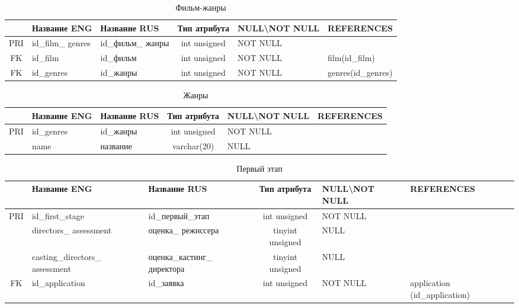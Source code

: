 \documentclass[11pt,a4paper,final]{article} %
\begin{document}
	
\begin{table}[H]
	\centering
	\begin{tabular}{|c|p{2.8cm}|p{2.5cm}|c|p{2cm}|p{3.5cm}|}
		\hline
		& Название ENG & Название RUS & Тип атрибута & NULL\textbackslash \newline NOT NULL & REFERENCES \\
		\hline
		PRI & id\_film\_ \newline genres & id\_фильм\_ жанры & int unsigned & NOT NULL &  \\
		\hline
		FK & id\_film & id\_фильм & int unsigned & NOT NULL & film(id\_film) \\
		\hline
	    FK & id\_genres & id\_жанры & int unsigned & NOT NULL & genres(id\_genres) \\
		\hline
	\end{tabular}
	\caption{Фильм-жанры}
	\label{tab:filmgenres}
\end{table}	


\begin{table}[H]
	\centering
	\begin{tabular}{|c|p{2.8cm}|p{2.5cm}|c|p{2cm}|p{3.5cm}|}
		\hline
		& Название ENG & Название RUS & Тип атрибута & NULL\textbackslash \newline NOT NULL & REFERENCES \\
		\hline
		PRI & id\_genres & id\_жанры  & int unsigned & NOT NULL &  \\
		\hline
		& name & название & varchar(20) & NULL & \\
		\hline
	\end{tabular}
	\caption{Жанры}
	\label{tab:genres}
\end{table}		
	

\begin{table}[H]
	\centering
	\begin{tabular}{|c|p{3cm}|p{3cm}|c|p{2cm}|p{2.6cm}|}
		\hline
		& Название ENG & Название RUS & Тип атрибута & NULL\textbackslash \newline NOT NULL & REFERENCES \\
		\hline
		PRI & id\_first\_stage & id\_первый\_этап & int unsigned & NOT NULL &  \\
		\hline
		& directors\_ \newline assessment & оценка\_ \newline режиссера & tinyint unsigned & NULL & \\
		\hline
		& casting\_directors\_ \newline assessment & оценка\_кастинг\_ \newline директора & tinyint unsigned & NULL & \\
		\hline
		FK & id\_application & id\_заявка & int unsigned & NOT NULL & application (id\_application) \\
		\hline
	\end{tabular}
	\caption{Первый этап}
	\label{tab:firstStage}
\end{table}	
\end{document}
